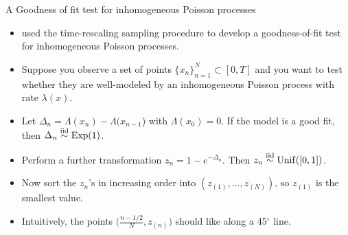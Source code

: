 \documentclass[aspectratio=169]{beamer}
\begin{document}
\begin{frame}[t]{A Goodness of fit test for inhomogeneous Poisson processes}
    \begin{itemize}
        \itemsep1em
        
        \item \citet{brown2002time} used the time-rescaling sampling procedure to develop a goodness-of-fit test for inhomogeneous Poisson processes.
        
        \item<2-> Suppose you observe a set of points $\{x_n\}_{n=1}^N \subset [0,T]$ and you want to test whether they are well-modeled by an inhomogeneous Poisson process with rate $\lambda(x)$. 
        
        \item<3-> Let $\Delta_n = \Lambda(x_n) - \Lambda(x_{n-1}$) with $\Lambda(x_0) =0$. If the model is a good fit, then $\Delta_n \stackrel{\text{iid}}{\sim} \mathrm{Exp}(1)$.
        
        \item<4-> Perform a further transformation $z_n = 1 - e^{-\Delta_n}$. Then $z_n \stackrel{\text{iid}}{\sim} \mathrm{Unif}([0, 1])$.
        
        \item<5-> Now sort the $z_n$'s in increasing order into $(z_{(1)}, \ldots, z_{(N)})$, so $z_{(1)}$ is the smallest value.
        
        \item<6-> Intuitively, the points $\big(\tfrac{n-1/2}{N}, z_{(n)}\big)$ should like along a 45$^\circ$ line.
    \end{itemize}
\end{frame}
\end{document}
